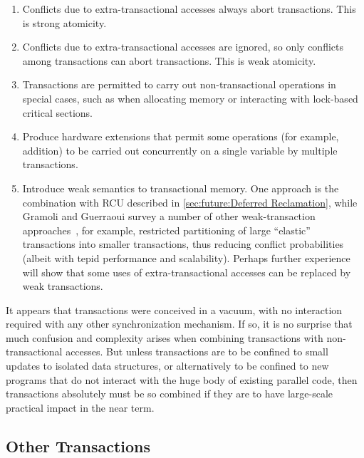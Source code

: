 \begin{enumerate}
\item	Conflicts due to extra-transactional accesses always abort
	transactions.
	This is strong atomicity.
\item	Conflicts due to extra-transactional accesses are ignored,
	so only conflicts among transactions can abort transactions.
	This is weak atomicity.
\item	Transactions are permitted to carry out non-transactional
	operations in special cases, such as when allocating memory or
	interacting with lock-based critical sections.
\item	Produce hardware extensions that permit some operations
	(for example, addition) to be carried out concurrently on a
	single variable by multiple transactions.
\item	Introduce weak semantics to transactional memory.
	One approach is the combination with RCU described in
	\cref{sec:future:Deferred Reclamation},
	while Gramoli and Guerraoui
	survey a number of other weak-transaction
	approaches~\cite{Gramoli:2014:DTP:2541883.2541900}, for example,
	restricted partitioning of large
	``elastic'' transactions into smaller transactions, thus
	reducing conflict probabilities (albeit with tepid performance
	and scalability).
	Perhaps further experience will show that some uses of
	extra-transactional accesses can be replaced by weak
	transactions.
\end{enumerate}

It appears that transactions were conceived in a vacuum, with no
interaction required with any other synchronization mechanism.
If so, it is no surprise that much confusion and complexity arises when
combining transactions with non-transactional accesses.
But unless transactions are to be confined to small updates to isolated
data structures, or alternatively to be confined to new programs
that do not interact with the huge body of existing parallel code,
then transactions absolutely must be so combined if they are to have
large-scale practical impact in the near term.

\subsection{Other Transactions}
\label{sec:future:Other Transactions}

